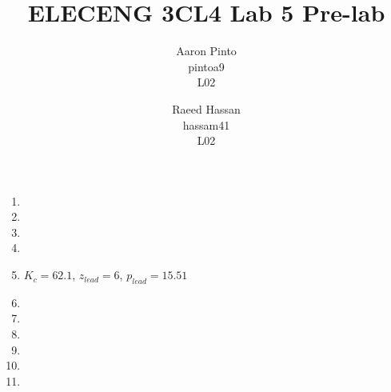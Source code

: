 \documentclass[12pt]{article}
\title{ELECENG 3CL4 Lab 5 Pre-lab}
\author{
    Aaron Pinto \\
    pintoa9 \\
    L02
    \and
    Raeed Hassan \\
    hassam41 \\
    L02
}
\begin{document}
\maketitle
\clearpage

\begin{enumerate}
	\item %

	\item %
	
	\item %
	
	\item %
	
	\item %
	$K_c = 62.1$, $z_{lead} = 6$, $p_{lead} = 15.51$
	
	\item %
	
	\item %
	
	\item %
	
	\item %
	
	\item %
	
	\item %
\end{enumerate}
\end{document}
